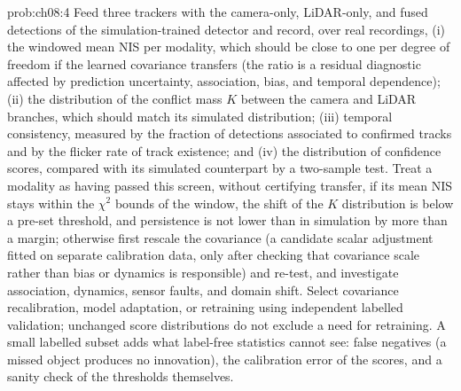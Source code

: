 \begin{sol}{prob:ch08:4}
Feed three trackers with the camera-only, LiDAR-only, and fused detections of the simulation-trained detector and record, over real recordings, (i) the windowed mean NIS per modality, which should be close to one per degree of freedom if the learned covariance transfers (the ratio is a residual diagnostic affected by prediction uncertainty, association, bias, and temporal dependence); (ii) the distribution of the conflict mass $K$ between the camera and LiDAR branches, which should match its simulated distribution; (iii) temporal consistency, measured by the fraction of detections associated to confirmed tracks and by the flicker rate of track existence; and (iv) the distribution of confidence scores, compared with its simulated counterpart by a two-sample test. Treat a modality as having passed this screen, without certifying transfer, if its mean NIS stays within the $\chi^2$ bounds of the window, the shift of the $K$ distribution is below a pre-set threshold, and persistence is not lower than in simulation by more than a margin; otherwise first rescale the covariance (a candidate scalar adjustment fitted on separate calibration data, only after checking that covariance scale rather than bias or dynamics is responsible) and re-test, and investigate association, dynamics, sensor faults, and domain shift. Select covariance recalibration, model adaptation, or retraining using independent labelled validation; unchanged score distributions do not exclude a need for retraining. A small labelled subset adds what label-free statistics cannot see: false negatives (a missed object produces no innovation), the calibration error of the scores, and a sanity check of the thresholds themselves.
\end{sol}

